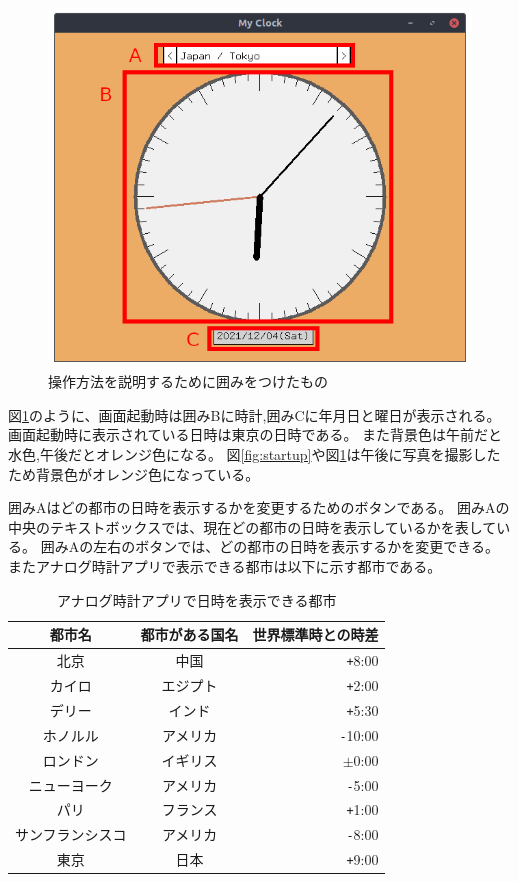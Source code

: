\documentclass[a4paper,11pt]{jsarticle}
\begin{document}
    \begin{figure}[H]
      \centering
      \includegraphics[scale=0.3]{./readme_img/startup_control.png}
      \caption{操作方法を説明するために囲みをつけたもの}
      \label{fig:startup-control}
    \end{figure}

    図\ref{fig:startup-control}のように、画面起動時は囲みBに時計,囲みCに年月日と曜日が表示される。
    画面起動時に表示されている日時は東京の日時である。
    また背景色は午前だと水色,午後だとオレンジ色になる。
    図\ref{fig:startup}や図\ref{fig:startup-control}は午後に写真を撮影したため背景色がオレンジ色になっている。

    囲みAはどの都市の日時を表示するかを変更するためのボタンである。
    囲みAの中央のテキストボックスでは、現在どの都市の日時を表示しているかを表している。
    囲みAの左右のボタンでは、どの都市の日時を表示するかを変更できる。
    またアナログ時計アプリで表示できる都市は以下に示す都市である。

    \begin{table}[H]
      \centering
      \caption{アナログ時計アプリで日時を表示できる都市}
      \label{tb:city-list}
      \begin{tabular}{|c|c|r|}\hline
        都市名&都市がある国名&\multicolumn{1}{|c|}{世界標準時との時差}\\\hline\hline
        北京&中国&\texttt{+}8:00\\\hline
        カイロ&エジプト&\texttt{+}2:00\\\hline
        デリー&インド&\texttt{+}5:30\\\hline
        ホノルル&アメリカ&\texttt{-}10:00\\\hline
        ロンドン&イギリス&\texttt{$\pm$}0:00\\\hline
        ニューヨーク&アメリカ&\texttt{-}5:00\\\hline
        パリ&フランス&\texttt{+}1:00\\\hline
        サンフランシスコ&アメリカ&\texttt{-}8:00\\\hline
        東京&日本&\texttt{+}9:00\\\hline
      \end{tabular}
    \end{table}
    
\end{document}
